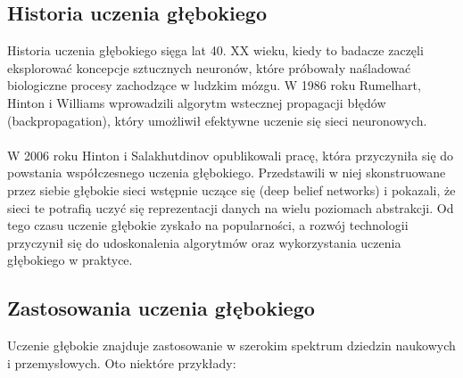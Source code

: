 \subsection{Historia uczenia głębokiego}
Historia uczenia głębokiego sięga lat 40. XX wieku, kiedy to badacze zaczęli eksplorować koncepcje sztucznych neuronów, które próbowały naśladować biologiczne procesy zachodzące w ludzkim mózgu. W 1986 roku Rumelhart, Hinton i Williams wprowadzili algorytm wstecznej propagacji błędów (backpropagation), który umożliwił efektywne uczenie się sieci neuronowych.
\paragraph{}
W 2006 roku Hinton i Salakhutdinov opublikowali pracę, która przyczyniła się do powstania współczesnego uczenia głębokiego. Przedstawili w niej skonstruowane przez siebie głębokie sieci wstępnie uczące się (deep belief networks) i pokazali, że sieci te potrafią uczyć się reprezentacji danych na wielu poziomach abstrakcji. Od tego czasu uczenie głębokie zyskało na popularności, a rozwój technologii przyczynił się do udoskonalenia algorytmów oraz wykorzystania uczenia głębokiego w praktyce.

\subsection{Zastosowania uczenia głębokiego}
Uczenie głębokie znajduje zastosowanie w szerokim spektrum dziedzin naukowych i przemysłowych. Oto niektóre przykłady:

